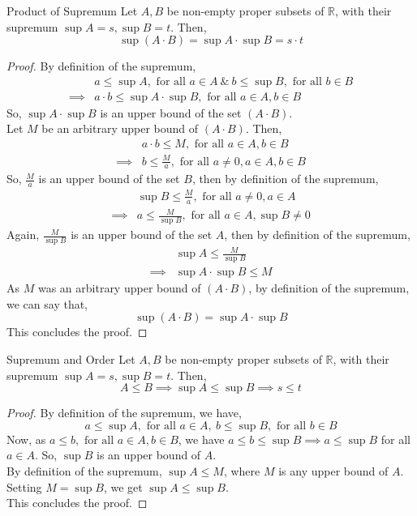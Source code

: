 \begin{Theorem}{Product of Supremum}\label{product_supremum}
    Let $A, B$ be non-empty proper subsets of $\mathbb{R}$, with their supremum $\sup A = s,\sup B=t$. Then, $$\sup (A\cdot B)=\sup A\cdot\sup B=s\cdot t$$
\end{Theorem}
\begin{proof}
    By definition of the supremum,
    \begin{align*}
        & a\leq\sup A,\text{ for all }a\in A\ \&\ b\leq\sup B,\text{ for all }b\in B\\
        \implies &a\cdot b\leq\sup A\cdot\sup B,\text{ for all }a\in A, b\in B
    \end{align*}
    So, $\sup A\cdot\sup B$ is an upper bound of the set $(A\cdot B)$.\\
    Let $M$ be an arbitrary upper bound of $(A\cdot B)$. Then,
    \begin{align*}
        &a\cdot b\leq M,\text{ for all }a\in A,b\in B\\
        \implies&b\leq \frac{M}{a},\text{ for all }a\neq 0,a\in A,b\in B
    \end{align*}
    So, $\frac{M}{a}$ is an upper bound of the set $B$, then by definition of the supremum,
    \begin{align*}
        &\sup B\leq \frac{M}{a},\text{ for all }a\neq0,a\in A\\
        \implies&a\leq \frac{M}{\sup B},\text{ for all }a\in A,\sup B\neq 0
    \end{align*}
    Again, $\frac{M}{\sup B}$ is an upper bound of the set $A$, then by definition of the supremum,
    \begin{align*}
        &\sup A\leq \frac{M}{\sup B}\\
        \implies&\sup A\cdot\sup B\leq M
    \end{align*}
    As $M$ was an arbitrary upper bound of $(A\cdot B)$, by definition of the supremum, we can say that, $$\sup(A\cdot B)=\sup A\cdot \sup B$$ This concludes the proof.
\end{proof}
\begin{Theorem}{Supremum and Order}\label{supremum_order}
    Let $A, B$ be non-empty proper subsets of $\mathbb{R}$, with their supremum $\sup A = s,\sup B=t$. Then, $$A\leq B\implies\sup A\leq\sup B\implies s\leq t$$
\end{Theorem}
\begin{proof}
    By definition of the supremum, we have,
    $$a\leq\sup A,\text{ for all }a\in A,\ b\leq\sup B,\text{ for all }b\in B$$
    Now, as $a\leq b,\text{ for all }a\in A, b\in B$, we have $a\leq b\leq\sup B\implies a\leq\sup B$ for all $a\in A$. So, $\sup B$ is an upper bound of $A$.\\
    By definition of the supremum, $\sup A\leq M$, where $M$ is any upper bound of $A$. Setting $M=\sup B$, we get $\sup A\leq\sup B$.\\
    This concludes the proof.
\end{proof}
